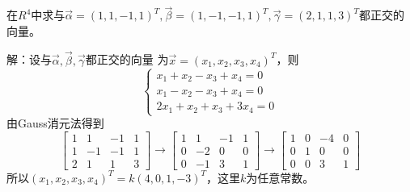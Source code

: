 \begin{eg}
在$R^4$中求与$\vec{\alpha}=(1,1,-1,1)^T,\vec{\beta}=(1,-1,-1,1)^T,
\vec{\gamma}=(2,1,1,3)^T$都正交的向量。
\end{eg}
解：设与$\vec{\alpha},\vec{\beta},\vec{\gamma}$都正交的向量
为$\vec{x}=(x_1,x_2,x_3,x_4)^T$，则
\begin{equation*}
\begin{cases}
x_1+x_2-x_3+x_4=0\\
x_1-x_2-x_3+x_4=0\\
2x_1+x_2+x_3+3x_4=0
\end{cases}
\end{equation*}
由Gauss消元法得到
\begin{equation*}
\begin{bmatrix}
1&1&-1&1\\1&-1&-1&1\\2&1&1&3
\end{bmatrix}
\rightarrow
\begin{bmatrix}
1&1&-1&1\\0&-2&0&0\\0&-1&3&1
\end{bmatrix}
\rightarrow
\begin{bmatrix}
1&0&-4&0\\0&1&0&0\\0&0&3&1
\end{bmatrix}
\end{equation*}
所以$(x_1,x_2,x_3,x_4)^T=k(4,0,1,-3)^T$，这里$k$为任意常数。

